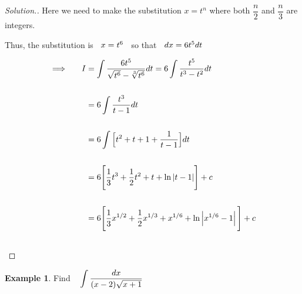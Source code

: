 \documentclass[11pt,a4paper]{article}
\theoremstyle{definition}
\newtheorem{exa}[thm]{Example}
\newenvironment{solution}
  {\renewcommand{\qedsymbol}{}\begin{proof}[\textit{Solution}.]}
  {\end{proof}}
\begin{document}
\begin{solution}


Here we need to make the substitution $x = t^n$ where both $\dfrac{n}{2}$ and $\dfrac{n}{3}$ are integers.


Thus, the substitution is $\hspace{0.2cm} x = t^6\hspace{0.2cm}$ so that $\hspace{0.2cm} dx = 6t^5dt$

\begin{align*}
\implies\hspace{0.5cm} I & = \int \dfrac{6t^5}{\sqrt{t^6}- \sqrt[3]{t^6}}dt
 = 6\int \dfrac{t^5}{t^3 - t^2}dt\\\\
& = 6\int \dfrac{t^3}{t - 1}dt\\\\
& = 6\int \Big[t^2 + t + 1 + \dfrac{1}{t - 1}\Big]dt\\\\\
& = 6\Bigg[\dfrac{1}{3}t^3 + \dfrac{1}{2}t^2 + t + \ln |t - 1|\Bigg] + c\\\\
& = 6\Bigg[\frac{1}{3}x^{1/2} + \dfrac{1}{2}x^{1/3} + x^{1/6} + \ln \left|x^{1/6} - 1\right|\Bigg] + c\\\\
\end{align*}
\end{solution}

\begin{exa}


Find $\hspace{0.3cm} \displaystyle{\int \dfrac{dx}{(x- 2)\sqrt{x + 1}}}$
\end{exa}
\end{document}
